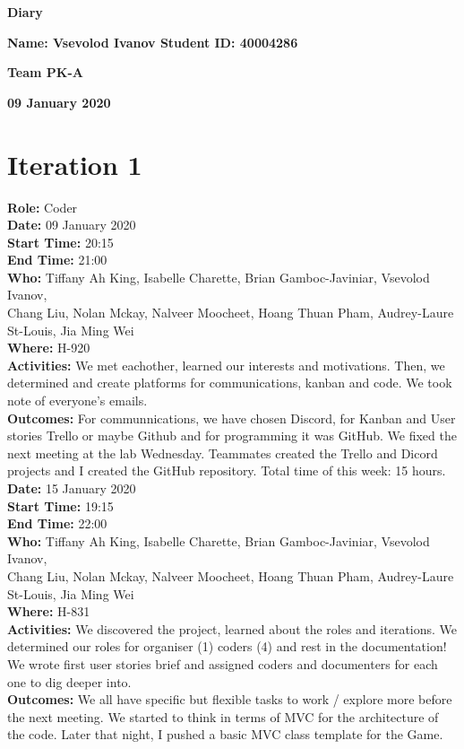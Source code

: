 \documentclass[12pt]{article}
\begin{document}
\vspace*{0.2in}
\centerline{\bf\Large Diary}

\vspace*{0.2in}
\centerline{\bf\Large Name: Vsevolod Ivanov   Student ID: 40004286}

\vspace*{0.2in}
\centerline{\bf\Large Team PK-A}

\vspace*{0.2in}
\centerline{\bf\Large 09 January 2020}

\section{Iteration 1}

{\bf Role:} Coder\\

{\bf Date:} 09 January 2020\\
{\bf Start Time:} 20:15\\
{\bf End Time:} 21:00 \\
{\bf Who:} Tiffany Ah King, Isabelle Charette, Brian Gamboc-Javiniar, Vsevolod Ivanov,\\
Chang Liu, Nolan Mckay, Nalveer Moocheet, Hoang Thuan Pham, Audrey-Laure St-Louis, Jia Ming Wei\\
{\bf Where:} H-920 \\
{\bf Activities:} We met eachother, learned our interests and motivations. Then, we determined and create platforms for communications, kanban and code. We took note of everyone's emails.\\
{\bf Outcomes:} For communnications, we have chosen Discord, for Kanban and User stories Trello or maybe Github and for programming it was GitHub. We fixed the next meeting at the lab Wednesday. Teammates created the Trello and Dicord projects and I created the GitHub repository. Total time of this week: 15 hours.\\

{\bf Date:} 15 January 2020\\
{\bf Start Time:} 19:15\\
{\bf End Time:} 22:00\\
{\bf Who:} Tiffany Ah King, Isabelle Charette, Brian Gamboc-Javiniar, Vsevolod Ivanov,\\
Chang Liu, Nolan Mckay, Nalveer Moocheet, Hoang Thuan Pham, Audrey-Laure St-Louis, Jia Ming Wei\\
{\bf Where:} H-831\\
{\bf Activities:} We discovered the project, learned about the roles and iterations. We determined our roles for organiser (1) coders (4) and rest in the documentation! We wrote first user stories brief and assigned coders and documenters for each one to dig deeper into.\\
{\bf Outcomes:} We all have specific but flexible tasks to work / explore more before the next meeting. We started to think in terms of MVC for the architecture of the code. Later that night, I pushed a basic MVC class template for the Game.\\\\
\end{document}
